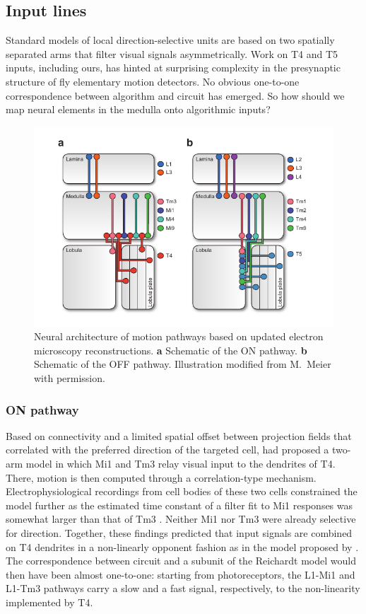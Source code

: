 \subsection{Input lines}
Standard models of local direction-selective units are based on two spatially separated arms that filter visual signals asymmetrically. Work on T4 and T5 inputs, including ours, has hinted at surprising complexity in the presynaptic structure of fly elementary motion detectors. No obvious one-to-one correspondence between algorithm and circuit has emerged. So how should we map neural elements in the medulla onto algorithmic inputs?

\begin{figure}
    \centering
    \includegraphics[width=1\textwidth]{graphics/figure_pathway}
    \caption[Map of ON and OFF pathways]
    {Neural architecture of motion pathways based on updated electron microscopy reconstructions. \textbf{a} Schematic of the ON pathway. \textbf{b} Schematic of the OFF pathway. Illustration modified from M.\ Meier with permission.}
    \label{fig:pathway}
\end{figure}


\subsubsection{ON pathway}
Based on connectivity and a limited spatial offset between projection fields that correlated with the preferred direction of the targeted cell, \citet{Takemura:2013ea} had proposed a two-arm model in which Mi1 and Tm3 relay visual input to the dendrites of T4. There, motion is then computed through a correlation-type mechanism. Electrophysiological recordings from cell bodies of these two cells constrained the model further as the estimated time constant of a filter fit to Mi1 responses was somewhat larger than that of Tm3 \citep{Behnia:2014jh}. Neither Mi1 nor Tm3 were already selective for direction. Together, these findings predicted that input signals are combined on T4 dendrites in a non-linearly opponent fashion as in the model proposed by \citet{Barlow:1965aa}. The correspondence between circuit and a subunit of the Reichardt model would then have been almost one-to-one: starting from photoreceptors, the L1-Mi1 and L1-Tm3 pathways carry a slow and a fast signal, respectively, to the non-linearity implemented by T4.

